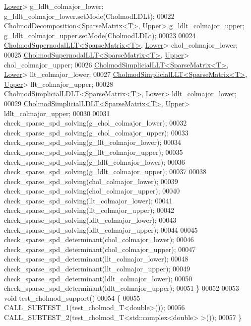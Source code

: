 \begin{DoxyCode}
      \hyperlink{group__enums_gga39e3366ff5554d731e7dc8bb642f83cda891792b8ed394f7607ab16dd716f60e6}{Lower}> g\_ldlt\_colmajor\_lower; g\_ldlt\_colmajor\_lower.setMode(CholmodLDLt);
00022   \hyperlink{class_eigen_1_1_cholmod_decomposition}{CholmodDecomposition<SparseMatrix<T>}, 
      \hyperlink{group__enums_gga39e3366ff5554d731e7dc8bb642f83cda6bcb58be3b8b8ec84859ce0c5ac0aaec}{Upper}> g\_ldlt\_colmajor\_upper; g\_ldlt\_colmajor\_upper.setMode(CholmodLDLt);
00023   
00024   \hyperlink{class_eigen_1_1_cholmod_supernodal_l_l_t}{CholmodSupernodalLLT<SparseMatrix<T>}, 
      \hyperlink{group__enums_gga39e3366ff5554d731e7dc8bb642f83cda891792b8ed394f7607ab16dd716f60e6}{Lower}> chol\_colmajor\_lower;
00025   \hyperlink{class_eigen_1_1_cholmod_supernodal_l_l_t}{CholmodSupernodalLLT<SparseMatrix<T>}, 
      \hyperlink{group__enums_gga39e3366ff5554d731e7dc8bb642f83cda6bcb58be3b8b8ec84859ce0c5ac0aaec}{Upper}> chol\_colmajor\_upper;
00026   \hyperlink{class_eigen_1_1_cholmod_simplicial_l_l_t}{CholmodSimplicialLLT<SparseMatrix<T>}, 
      \hyperlink{group__enums_gga39e3366ff5554d731e7dc8bb642f83cda891792b8ed394f7607ab16dd716f60e6}{Lower}> llt\_colmajor\_lower;
00027   \hyperlink{class_eigen_1_1_cholmod_simplicial_l_l_t}{CholmodSimplicialLLT<SparseMatrix<T>}, 
      \hyperlink{group__enums_gga39e3366ff5554d731e7dc8bb642f83cda6bcb58be3b8b8ec84859ce0c5ac0aaec}{Upper}> llt\_colmajor\_upper;
00028   \hyperlink{class_eigen_1_1_cholmod_simplicial_l_d_l_t}{CholmodSimplicialLDLT<SparseMatrix<T>}, 
      \hyperlink{group__enums_gga39e3366ff5554d731e7dc8bb642f83cda891792b8ed394f7607ab16dd716f60e6}{Lower}> ldlt\_colmajor\_lower;
00029   \hyperlink{class_eigen_1_1_cholmod_simplicial_l_d_l_t}{CholmodSimplicialLDLT<SparseMatrix<T>}, 
      \hyperlink{group__enums_gga39e3366ff5554d731e7dc8bb642f83cda6bcb58be3b8b8ec84859ce0c5ac0aaec}{Upper}> ldlt\_colmajor\_upper;
00030 
00031   check\_sparse\_spd\_solving(g\_chol\_colmajor\_lower);
00032   check\_sparse\_spd\_solving(g\_chol\_colmajor\_upper);
00033   check\_sparse\_spd\_solving(g\_llt\_colmajor\_lower);
00034   check\_sparse\_spd\_solving(g\_llt\_colmajor\_upper);
00035   check\_sparse\_spd\_solving(g\_ldlt\_colmajor\_lower);
00036   check\_sparse\_spd\_solving(g\_ldlt\_colmajor\_upper);
00037   
00038   check\_sparse\_spd\_solving(chol\_colmajor\_lower);
00039   check\_sparse\_spd\_solving(chol\_colmajor\_upper);
00040   check\_sparse\_spd\_solving(llt\_colmajor\_lower);
00041   check\_sparse\_spd\_solving(llt\_colmajor\_upper);
00042   check\_sparse\_spd\_solving(ldlt\_colmajor\_lower);
00043   check\_sparse\_spd\_solving(ldlt\_colmajor\_upper);
00044 
00045   check\_sparse\_spd\_determinant(chol\_colmajor\_lower);
00046   check\_sparse\_spd\_determinant(chol\_colmajor\_upper);
00047   check\_sparse\_spd\_determinant(llt\_colmajor\_lower);
00048   check\_sparse\_spd\_determinant(llt\_colmajor\_upper);
00049   check\_sparse\_spd\_determinant(ldlt\_colmajor\_lower);
00050   check\_sparse\_spd\_determinant(ldlt\_colmajor\_upper);
00051 \}
00052 
00053 \textcolor{keywordtype}{void} test\_cholmod\_support()
00054 \{
00055   CALL\_SUBTEST\_1(test\_cholmod\_T<double>());
00056   CALL\_SUBTEST\_2(test\_cholmod\_T<std::complex<double> >());
00057 \}
\end{DoxyCode}
